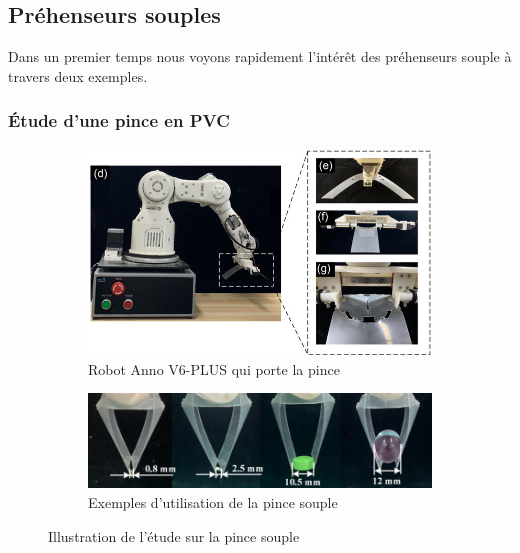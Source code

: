 \documentclass[a4paper, 11pt]{report}
\begin{document}
    \subsection{Préhenseurs souples}

        Dans un premier temps nous voyons rapidement l'intérêt des préhenseurs souple à travers deux exemples.

        \subsubsection{Étude d'une pince en PVC}
            
            \begin{figure}[htbp]
                    \centering
                    \begin{subfigure}[t]{0.8\textwidth}
                        \centering
                        \includegraphics[width=\textwidth]{Figures/robot.png}
                        \caption{Robot Anno V6-PLUS qui porte la pince \cite{liu_origami_2023}}
                    \end{subfigure}
                    \hfill
                    \begin{subfigure}[t]{0.8\textwidth}
                        \centering
                        \includegraphics[width=\textwidth]{Figures/adaptability.png}
                        \caption{Exemples d'utilisation de la pince souple \cite{liu_origami_2023}}
                    \end{subfigure}
                    \caption{Illustration de l'étude sur la pince souple}
                    \label{fig:origami}
                \end{figure}
        
\end{document}
